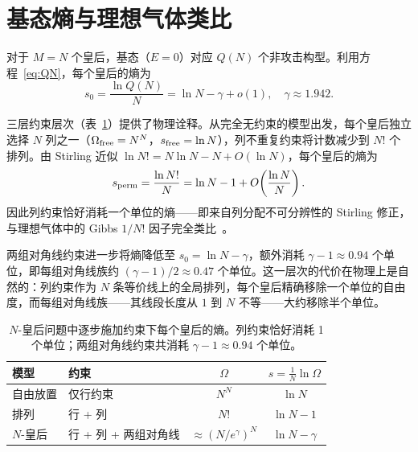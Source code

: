 \documentclass[aps, pre, reprint, amsmath, amssymb, superscriptaddress, floatfix]{revtex4-2}
\begin{document}
\section{基态熵与理想气体类比}
\label{sec:entropy}

对于 $M = N$ 个皇后，基态（$E = 0$）对应 $Q(N)$ 个非攻击构型。利用方程~\eqref{eq:QN}，每个皇后的熵为
\begin{equation}
  s_0 = \frac{\ln Q(N)}{N}
  = \ln N - \gamma + o(1), \quad \gamma \approx 1.942.
  \label{eq:s0}
\end{equation}

三层约束层次（表~\ref{tab:entropy_levels}）提供了物理诠释。从完全无约束的模型出发，每个皇后独立选择 $N$ 列之一（$\Omega_{\rm free} = N^N$，$s_{\rm free} = \ln N$），列不重复约束将计数减少到 $N!$ 个排列。由 Stirling 近似 $\ln N! = N\ln N - N + O(\ln N)$，每个皇后的熵为
\begin{equation}
  s_{\rm perm} = \frac{\ln N!}{N}
  = \ln N - 1 + O\!\left(\frac{\ln N}{N}\right).
  \label{eq:s_perm}
\end{equation}
因此列约束恰好消耗一个单位的熵——即来自列分配不可分辨性的 Stirling 修正，与理想气体中的 Gibbs $1/N!$ 因子完全类比~\cite{Reif1965}。

两组对角线约束进一步将熵降低至 $s_0 = \ln N - \gamma$，额外消耗 $\gamma - 1 \approx 0.94$ 个单位，即每组对角线族约 $(\gamma - 1)/2 \approx 0.47$ 个单位。这一层次的代价在物理上是自然的：列约束作为 $N$ 条等价线上的全局排列，每个皇后精确移除一个单位的自由度，而每组对角线族——其线段长度从 $1$ 到 $N$ 不等——大约移除半个单位。

\begin{table}[b]
  \caption{$N$-皇后问题中逐步施加约束下每个皇后的熵。列约束恰好消耗 1 个单位；两组对角线约束共消耗 $\gamma - 1 \approx 0.94$ 个单位。}
  \label{tab:entropy_levels}
  \begin{ruledtabular}
  \begin{tabular}{llcc}
    模型 & 约束 & $\Omega$ & $s = \frac{1}{N}\ln\Omega$ \\
    \hline
    自由放置 & 仅行约束 & $N^N$ & $\ln N$ \\
    排列 & 行 + 列 & $N!$ & $\ln N - 1$ \\
    $N$-皇后 & 行 + 列 + 两组对角线 & $\approx (N/e^\gamma)^N$
      & $\ln N - \gamma$ \\
  \end{tabular}
  \end{ruledtabular}
\end{table}
\end{document}
